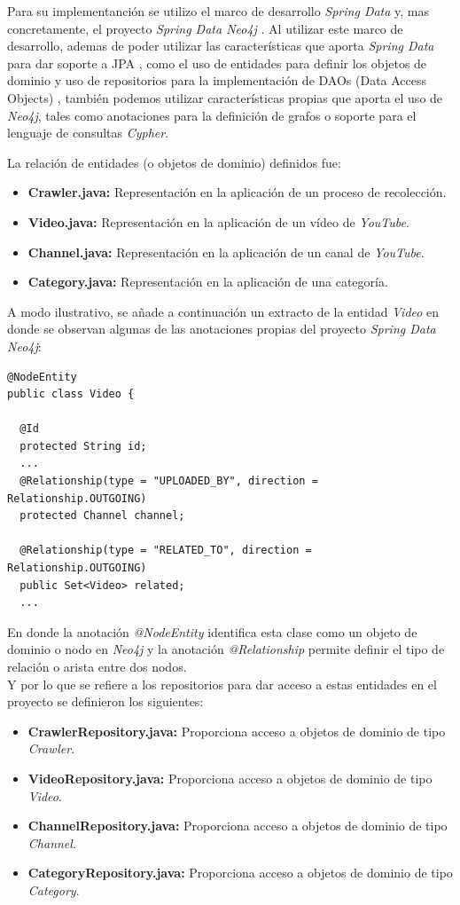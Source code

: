 \documentclass[11pt,a4paper]{article}
\begin{document}
Para su implementanción se utilizo el marco de desarrollo \textit{Spring Data} y, mas concretamente, el proyecto \textit{Spring Data Neo4j} \cite{39}. Al utilizar este marco de desarrollo, ademas de poder utilizar las características que aporta \textit{Spring Data} para dar soporte a JPA \cite{40}, como el uso de entidades para definir los objetos de dominio y uso de repositorios para la implementación de DAOs (Data Access Objects) \cite{41}, también podemos utilizar características propias que aporta el uso de \textit{Neo4j}, tales como anotaciones para la definición de grafos o soporte para el lenguaje de consultas \textit{Cypher}.
\pagebreak 

La relación de entidades (o objetos de dominio) definidos fue:
\begin{itemize}
\item \textbf{Crawler.java:} Representación en la aplicación de un proceso de recolección.
\item \textbf{Video.java:} Representación en la aplicación de un vídeo de \textit{YouTube}.
\item \textbf{Channel.java:} Representación en la aplicación de un canal de \textit{YouTube}.
\item \textbf{Category.java:} Representación en la aplicación de una categoría.
\end{itemize}

A modo ilustrativo, se añade a continuación un extracto de la entidad \textit{Video} en donde se observan algunas de las anotaciones propias del proyecto \textit{Spring Data Neo4j}:
\begin{lstlisting}[style=C]
@NodeEntity
public class Video {
  
  @Id
  protected String id;
  ...
  @Relationship(type = "UPLOADED_BY", direction = Relationship.OUTGOING)
  protected Channel channel;
	
  @Relationship(type = "RELATED_TO", direction = Relationship.OUTGOING)
  public Set<Video> related;
  ...
\end{lstlisting}
En donde la anotación \textit{@NodeEntity} identifica esta clase como un objeto de dominio o nodo en \textit{Neo4j} y la anotación \textit{@Relationship} permite definir el tipo de relación o arista entre dos nodos.
\\

Y por lo que se refiere a los repositorios para dar acceso a estas entidades en el proyecto se definieron los siguientes:
\begin{itemize}
\item \textbf{CrawlerRepository.java:} Proporciona acceso a objetos de dominio de tipo \textit{Crawler}.
\item \textbf{VideoRepository.java:} Proporciona acceso a objetos de dominio de tipo \textit{Video}.
\item \textbf{ChannelRepository.java:} Proporciona acceso a objetos de dominio de tipo \textit{Channel}.
\item \textbf{CategoryRepository.java:} Proporciona acceso a objetos de dominio de tipo \textit{Category}.
\end{itemize}
\end{document}
